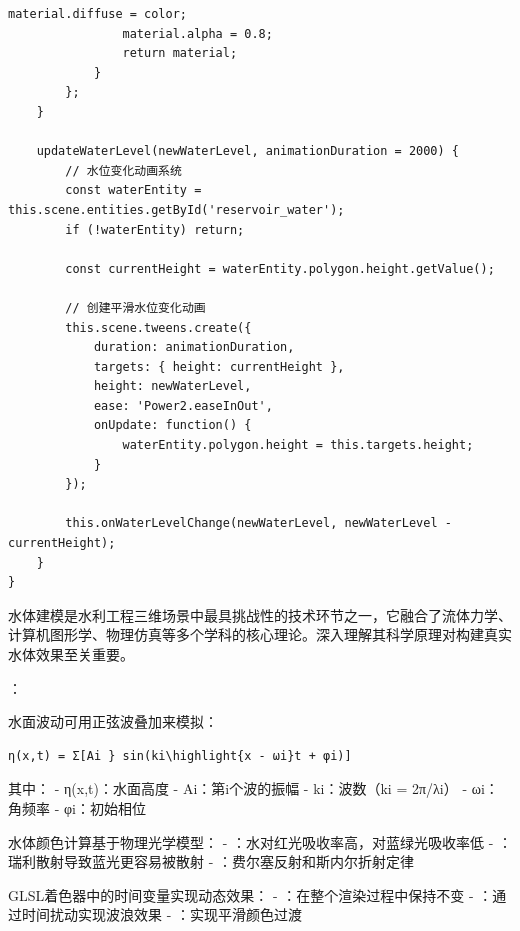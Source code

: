 \begin{lstlisting}[style=javascript]
                material.diffuse = color;
                material.alpha = 0.8;
                return material;
            }
        };
    }
    
    updateWaterLevel(newWaterLevel, animationDuration = 2000) {
        // 水位变化动画系统
        const waterEntity = this.scene.entities.getById('reservoir_water');
        if (!waterEntity) return;
        
        const currentHeight = waterEntity.polygon.height.getValue();
        
        // 创建平滑水位变化动画
        this.scene.tweens.create({
            duration: animationDuration,
            targets: { height: currentHeight },
            height: newWaterLevel,
            ease: 'Power2.easeInOut',
            onUpdate: function() {
                waterEntity.polygon.height = this.targets.height;
            }
        });
        
        this.onWaterLevelChange(newWaterLevel, newWaterLevel - currentHeight);
    }
}
\end{lstlisting}


水体建模是水利工程三维场景中最具挑战性的技术环节之一，它融合了流体力学、计算机图形学、物理仿真等多个学科的核心理论。深入理解其科学原理对构建真实水体效果至关重要。

：


水面波动可用正弦波叠加来模拟：

\begin{lstlisting}
η(x,t) = Σ[Ai } sin(ki\highlight{x - ωi}t + φi)]
\end{lstlisting}

其中： - η(x,t)：水面高度 - Ai：第i个波的振幅 - ki：波数（ki = 2π/λi） - ωi：角频率 - φi：初始相位


水体颜色计算基于物理光学模型： - ：水对红光吸收率高，对蓝绿光吸收率低 - ：瑞利散射导致蓝光更容易被散射 - ：费尔塞反射和斯内尔折射定律


GLSL着色器中的时间变量实现动态效果： - ：在整个渲染过程中保持不变 - ：通过时间扰动实现波浪效果 - ：实现平滑颜色过渡

